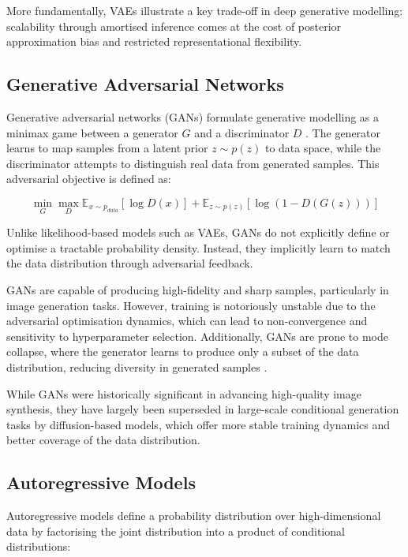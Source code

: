 \documentclass[a4paper,twoside,12pt]{report}
\begin{document}
More fundamentally, VAEs illustrate a key trade-off in deep generative modelling: scalability through amortised inference comes at the cost of posterior approximation bias and restricted representational flexibility.

\subsection{Generative Adversarial Networks}

Generative adversarial networks (GANs) formulate generative modelling as a minimax game between a generator \(G\) and a discriminator \(D\) \citep{goodfellow2014generative}. The generator learns to map samples from a latent prior \(z \sim p(z)\) to data space, while the discriminator attempts to distinguish real data from generated samples. This adversarial objective is defined as:

\begin{equation}
\min_G \max_D \mathbb{E}_{x \sim p_{data}}[\log D(x)] + \mathbb{E}_{z \sim p(z)}[\log(1 - D(G(z)))]
\end{equation}

Unlike likelihood-based models such as VAEs, GANs do not explicitly define or optimise a tractable probability density. Instead, they implicitly learn to match the data distribution through adversarial feedback.

GANs are capable of producing high-fidelity and sharp samples, particularly in image generation tasks. However, training is notoriously unstable due to the adversarial optimisation dynamics, which can lead to non-convergence and sensitivity to hyperparameter selection. Additionally, GANs are prone to mode collapse, where the generator learns to produce only a subset of the data distribution, reducing diversity in generated samples \citep{salimans2016improved, arjovsky2017wasserstein}.

While GANs were historically significant in advancing high-quality image synthesis, they have largely been superseded in large-scale conditional generation tasks by diffusion-based models, which offer more stable training dynamics and better coverage of the data distribution.

\subsection{Autoregressive Models}

Autoregressive models define a probability distribution over high-dimensional data by factorising the joint distribution into a product of conditional distributions:
\end{document}
